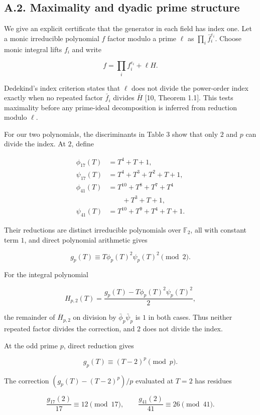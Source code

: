 \documentclass[11pt,a4paper]{article}
\begin{document}
\subsection{A.2. Maximality and dyadic prime
structure}\label{index-certificate}

We give an explicit certificate that the generator in each field has
index one. Let a monic irreducible polynomial \(f\) factor modulo a
prime \(\ell\) as \(\prod_i\bar f_i^{e_i}\). Choose monic integral lifts
\(f_i\) and write

\[
f=\prod_i f_i^{e_i}+\ell H.
\]

Dedekind's index criterion states that \(\ell\) does not divide the
power-order index exactly when no repeated factor \(\bar f_i\) divides
\(\bar H\) {[}10, Theorem 1.1{]}. This tests maximality before any
prime-ideal decomposition is inferred from reduction modulo \(\ell\).

For our two polynomials, the discriminants in Table 3 show that only
\(2\) and \(p\) can divide the index. At \(2\), define

\[
\begin{aligned}
\phi_{17}(T)&=T^4+T+1,\\
\psi_{17}(T)&=T^4+T^3+T^2+T+1,\\
\phi_{41}(T)&=T^{10}+T^8+T^7+T^4\\
&\qquad{}+T^3+T+1,\\
\psi_{41}(T)&=T^{10}+T^9+T^4+T+1.
\end{aligned}
\tag{A.2}
\]

Their reductions are distinct irreducible polynomials over
\(\mathbb F_2\), all with constant term \(1\), and direct polynomial
arithmetic gives

\[
g_p(T)\equiv T\phi_p(T)^2\psi_p(T)^2\pmod2.
\tag{A.3}
\]

For the integral polynomial

\[
H_{p,2}(T)=\frac{g_p(T)-T\phi_p(T)^2\psi_p(T)^2}{2},
\]

the remainder of \(\overline{H}_{p,2}\) on division by
\(\bar\phi_p\bar\psi_p\) is \(1\) in both cases. Thus neither repeated
factor divides the correction, and \(2\) does not divide the index.

At the odd prime \(p\), direct reduction gives

\[
g_p(T)\equiv(T-2)^p\pmod p.
\tag{A.4}
\]

The correction \((g_p(T)-(T-2)^p)/p\) evaluated at \(T=2\) has residues

\[
\frac{g_{17}(2)}{17}\equiv12\pmod{17},
\qquad
\frac{g_{41}(2)}{41}\equiv26\pmod{41}.
\tag{A.5}
\]
\end{document}
